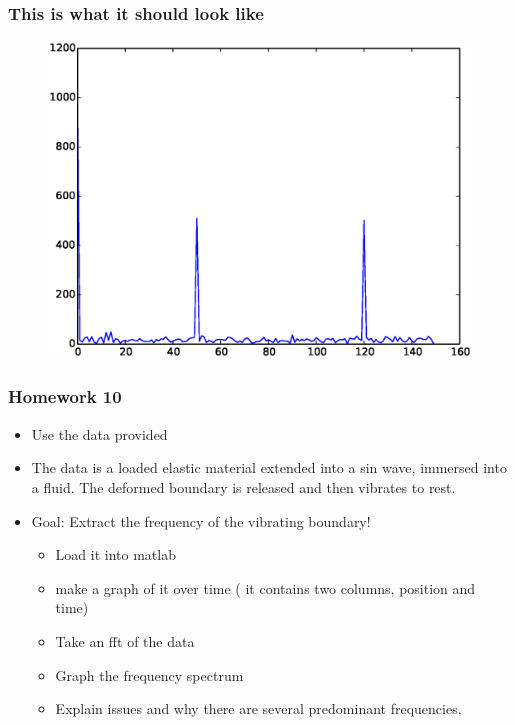 \documentclass[serif]{beamer}
\begin{document}
\begin{frame}
\frametitle{This is what it should look like} 

\begin{figure}
\includegraphics[width=\textwidth,height=0.8\textheight]{./freq_hw}
\end{figure}

\end{frame}
%

\begin{frame}
\frametitle{Homework 10}

\begin{itemize}

\item Use the data provided 
\item The data is a loaded elastic material extended into a sin wave, immersed into a fluid. The deformed boundary is released and then vibrates to rest. 
\item Goal: Extract the frequency of the vibrating boundary! 
\begin{itemize}
\item Load it into matlab 
\item make a graph of it over time ( it contains two columns, position and time)
\item Take an fft of the data
\item Graph the frequency spectrum
\item Explain issues and why there are several predominant frequencies.
\end{itemize}
\end{itemize}
\end{frame}

%
\end{document}

